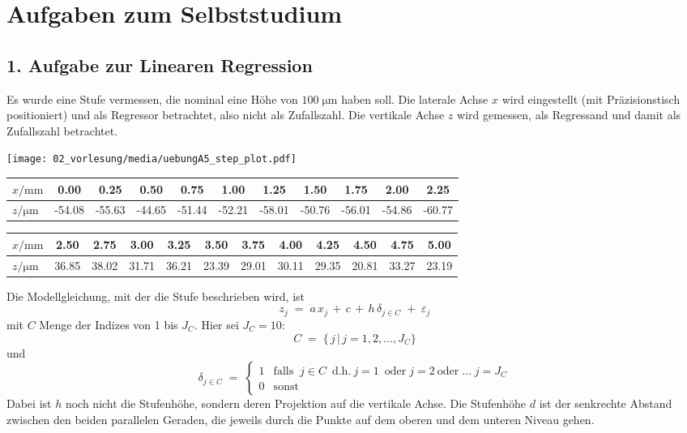 \section{Aufgaben zum Selbststudium}
\subsection{1. Aufgabe zur Linearen Regression}
\label{Vorl2Regressionsaufg1}
Es wurde eine Stufe vermessen, die nominal eine Höhe von $100 \; \mathrm{\mu m}$ haben soll.
Die laterale Achse $x$ wird eingestellt (mit Präzisionstisch positioniert) 
und als Regressor betrachtet, also nicht als Zufallszahl.
Die vertikale Achse $z$ wird gemessen, als Regressand und damit als Zufallszahl
betrachtet.

\begin{center}
	\texttt{[image: 02\_vorlesung/media/uebungA5\_step\_plot.pdf]}
\end{center}


\begin{tabular}{l|c|c|c|c|c|c|c|c|c|c}
	\hline
	$x / \mathrm{mm}$ &
	0.00 & 0.25 & 0.50 & 0.75 & 1.00 & 1.25 & 1.50 & 1.75 & 2.00 & 2.25 \\
	\hline
	$z / \mathrm{\mu m}$ &
	-54.08 &-55.63 &-44.65 &-51.44 &-52.21 &-58.01 &-50.76 &-56.01 &-54.86 &-60.77\\ 
	\hline
\end{tabular}

\vspace{2mm}

\begin{tabular}{l|c|c|c|c|c|c|c|c|c|c|c}
	\hline
	$x / \mathrm{mm}$  & 2.50 &
	2.75 & 3.00 & 3.25 & 3.50 & 3.75 & 4.00 & 4.25 & 4.50 & 4.75 & 5.00 \\
	\hline
	$z / \mathrm{\mu m}$ &36.85 &38.02 &31.71 &36.21 &23.39 &29.01 &30.11 &29.35 &20.81 &33.27 &23.19\\
	\hline
\end{tabular}

\vspace{2mm}

Die Modellgleichung, mit der die Stufe beschrieben wird, ist
$$
z_j \; = \; a \, x_j \, + \, c \, + \, h \, \delta_{j \in C} \; + \; \varepsilon_j
$$
mit $C$ Menge der Indizes von 1 bis $J_C$. Hier sei $J_C = 10$:
$$
C \; = \; \{\, j \, | \, j = 1, 2, \dots, J_C \}
$$
und
$$
\delta_{j \in C} \; = \; \left\{
\begin{array}{ll}
1 & \mathrm{falls} \; \;  j \in C \; \mathrm{~d.h.~} j = 1 \; \mathrm{~oder} \; j = 2
\mathrm{~oder} \; \dots \; j = J_C\\
0 & \mathrm{sonst}
\end{array} \right.
$$
Dabei ist $h$ noch nicht die Stufenhöhe, sondern deren Projektion auf die vertikale Achse.
Die Stufenhöhe $d$ ist der senkrechte Abstand zwischen den beiden parallelen Geraden, die jeweils durch die Punkte auf dem oberen und dem unteren Niveau gehen.


